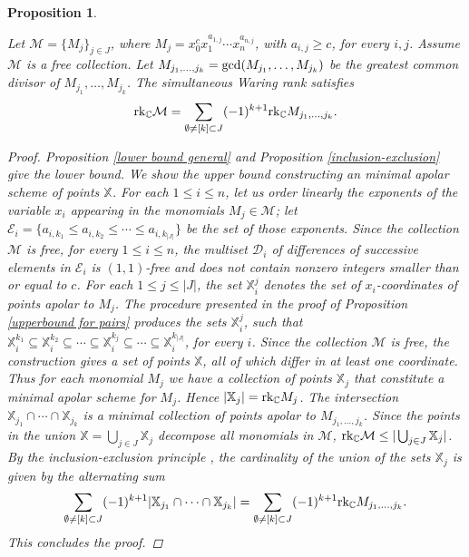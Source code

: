 \documentclass{amsart}
\theoremstyle{plain}
\newtheorem{proposition}[theorem]{Proposition}
\theoremstyle{definition}
\theoremstyle{remark}
\begin{document}
\begin{proposition}\label{inclusion-exclusion for c>1}

Let $\mathcal M= \lbrace M_j\rbrace_{j\in J}$, where $M_j=x_0^cx_1^{a_{1,j}}\cdots x_n^{a_{n,j}}$, with $a_{i,j}\geq c$, for every $i,j$. Assume $\mathcal M$ is a free collection. Let $M_{j_1,\ldots, j_k} = \textnormal{gcd}(M_{j_1}, \ldots, M_{j_k})$ be the greatest common divisor of $M_{j_1}, \ldots, M_{j_k}$. The simultaneous Waring rank satisfies
$$
\textnormal{rk}_{\mathbb C} \mathcal M = \sum_{\emptyset \neq [k] \subset J} (-1)^{k+1} \textnormal{rk}_{\mathbb C} M_{j_1,\ldots, j_k}.
$$

\begin{proof}
Proposition \ref{lower bound general} and Proposition \ref{inclusion-exclusion} give the lower bound. We show the upper bound constructing
an minimal apolar scheme of points $\mathbb X$. For each $1\leq i\leq n$, let us order linearly the exponents of the variable $x_i$ appearing in the monomials $M_j\in \mathcal M$; let $\mathcal E_i = \lbrace a_{i,k_1}\leq a_{i,k_2}\leq \cdots \leq a_{i,k_{|J|}}\rbrace$ be the set of those exponents. Since the collection $\mathcal M$ is {\it free}, for every $1\leq i\leq n$, the multiset $\mathcal D_i$ of differences of successive elements in $\mathcal E_i$ is $(1,1)$-free and does not contain nonzero integers smaller than or equal to $c$. For each $1\leq j \leq |J|$, the set $\mathbb X_i^j$ denotes the set of $x_i$-coordinates of points apolar to $M_j$. The procedure presented in the proof of Proposition \ref{upperbound for pairs} produces the sets $\mathbb X_i^j$, such that $\mathbb X_i^{k_1}\subseteq \mathbb X_i^{k_2}\subseteq \cdots \subseteq \mathbb X_i^{k_j}\subseteq \cdots \subseteq \mathbb X_i^{k_{|J|}}$, for every $i$. Since the collection $\mathcal M$ is {\it free}, the construction gives a set of points $\mathbb X$, all of which differ in at least one coordinate.\\
\indent Thus for each monomial $M_j$ we have a collection of points $\mathbb X_j$ that constitute a minimal apolar scheme for $M_j$. Hence $|\mathbb X_j| = \textnormal{rk}_{\mathbb C} M_j$. The intersection $\mathbb X_{j_1}\cap \cdots \cap \mathbb X_{j_k}$ is a minimal collection of points apolar to $M_{j_1,\ldots,j_k}$.
Since the points in the union $\mathbb X = \bigcup_{j\in J} \mathbb X_j$ decompose all monomials in $\mathcal M$, $\textnormal{rk}_{\mathbb C} \mathcal M \leq |\bigcup_{j\in J} \mathbb X_j|$. By the inclusion-exclusion principle \cite[Chapter 2.1]{St}, the cardinality of the union of the sets $\mathbb X_j$ is given by the alternating sum
$$
\sum_{\emptyset \neq [k] \subset J} (-1)^{k+1} |\mathbb X_{j_1}\cap \cdots \cap \mathbb X_{j_k}| = \sum_{\emptyset \neq [k] \subset J} (-1)^{k+1} \textnormal{rk}_{\mathbb C} M_{j_1,\ldots, j_k}.
$$
\noindent This concludes the proof.
\end{proof}

\end{proposition}
\end{document}
